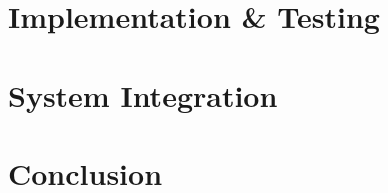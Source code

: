 \documentclass[16pt]{mythesis}
\begin{document}
\chapter{Implementation \& Testing}



\chapter{System Integration}



\chapter{Conclusion}


\end{document}
